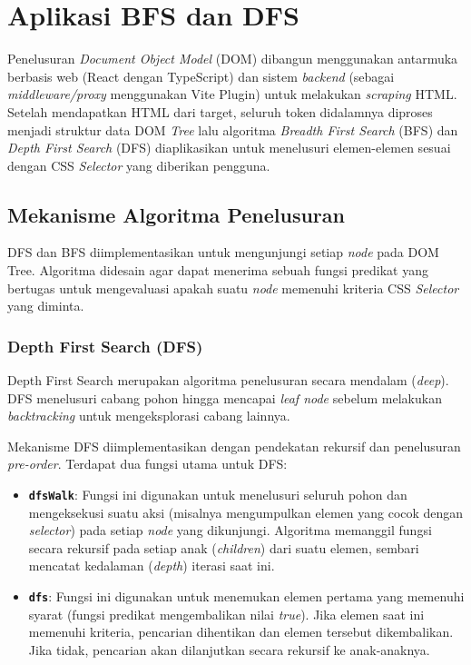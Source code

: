 \chapter{Aplikasi BFS dan DFS}

Penelusuran \textit{Document Object Model} (DOM) dibangun menggunakan antarmuka berbasis web (React dengan TypeScript) dan sistem \textit{backend} (sebagai \textit{middleware/proxy} menggunakan Vite Plugin) untuk melakukan \textit{scraping} HTML. Setelah mendapatkan HTML dari target, seluruh token didalamnya diproses menjadi struktur data DOM \textit{Tree} lalu algoritma \textit{Breadth First Search} (BFS) dan \textit{Depth First Search} (DFS) diaplikasikan untuk menelusuri elemen-elemen sesuai dengan CSS \textit{Selector} yang diberikan pengguna.

\section{Mekanisme Algoritma Penelusuran}

DFS dan BFS diimplementasikan untuk mengunjungi setiap \textit{node} pada DOM Tree. Algoritma didesain agar dapat menerima sebuah fungsi predikat yang bertugas untuk mengevaluasi apakah suatu \textit{node} memenuhi kriteria CSS \textit{Selector} yang diminta.

\subsection{Depth First Search (DFS)}
Depth First Search merupakan algoritma penelusuran secara mendalam (\textit{deep}). DFS menelusuri cabang pohon hingga mencapai \textit{leaf node} sebelum melakukan \textit{backtracking} untuk mengeksplorasi cabang lainnya.

Mekanisme DFS diimplementasikan dengan pendekatan rekursif dan penelusuran \textit{pre-order}. Terdapat dua fungsi utama untuk DFS:
\begin{itemize}
    \item \textbf{\texttt{dfsWalk}}: Fungsi ini digunakan untuk menelusuri seluruh pohon dan mengeksekusi suatu aksi (misalnya mengumpulkan elemen yang cocok dengan \textit{selector}) pada setiap \textit{node} yang dikunjungi. Algoritma memanggil fungsi secara rekursif pada setiap anak (\textit{children}) dari suatu elemen, sembari mencatat kedalaman (\textit{depth}) iterasi saat ini.
    \item \textbf{\texttt{dfs}}: Fungsi ini digunakan untuk menemukan elemen pertama yang memenuhi syarat (fungsi predikat mengembalikan nilai \textit{true}). Jika elemen saat ini memenuhi kriteria, pencarian dihentikan dan elemen tersebut dikembalikan. Jika tidak, pencarian akan dilanjutkan secara rekursif ke anak-anaknya.
\end{itemize}

